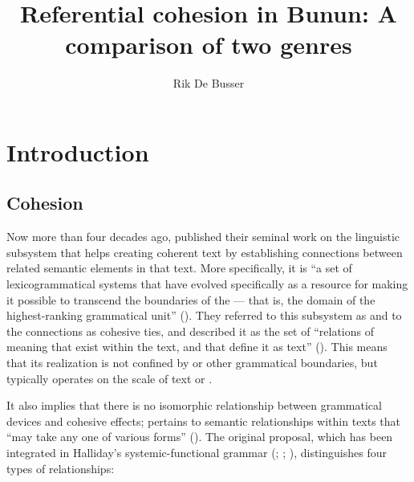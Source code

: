 \documentclass[output=paper
,modfonts
,nonflat]{langsci/langscibook}
\title{Referential cohesion in Bunun: A comparison of two genres}
\author{Rik De Busser\affiliation{National Chengchi University}}
\begin{document}
\maketitle

\section{\label{s1}Introduction}

\subsection{\label{s1.1}Cohesion}

Now more than four decades ago, \citet{Halliday1976} published their seminal work on the linguistic subsystem that helps creating coherent text by establishing connections between related semantic elements in that text. More specifically, it is “a set of lexicogrammatical systems that have evolved specifically as a resource for making it possible to transcend the boundaries of the  — that is, the domain of the highest-ranking grammatical unit” (\citealt[532]{Halliday2004}). They referred to this subsystem as  and to the connections as cohesive ties, and described it as the set of “relations of meaning that exist within the text, and that define it as text” (\citealt[4]{Halliday1976}). This means that its realization is not confined by  or other grammatical boundaries, but typically operates on the scale of text or . 

It also implies that there is no isomorphic relationship between grammatical devices and cohesive effects;  pertains to semantic relationships within texts that “may take any one of various forms” (\citealt[13]{Halliday1976}). The original proposal, which has been integrated in Halliday’s systemic-functional grammar (\citealt{Halliday1994}; \citealt{Halliday2004}; \citealt{Halliday2014}), distinguishes four types of relationships: 
\end{document}
